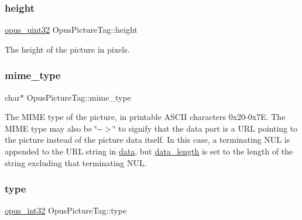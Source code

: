 \subsubsection{\texorpdfstring{height}{height}}
{\footnotesize\ttfamily \hyperlink{opus__types_8h_a643eaaadb9ef6cd44308e0299d8cd8ce}{opus\+\_\+uint32} Opus\+Picture\+Tag\+::height}

The height of the picture in pixels. \mbox{\label{struct_opus_picture_tag_ace7f4978d815b186f6aebefed938c9e2}} 
\subsubsection{\texorpdfstring{mime\+\_\+type}{mime\_type}}
{\footnotesize\ttfamily char$\ast$ Opus\+Picture\+Tag\+::mime\+\_\+type}

The M\+I\+ME type of the picture, in printable A\+S\+C\+II characters 0x20-\/0x7E. The M\+I\+ME type may also be {\ttfamily \char`\"{}-\/-\/$>$\char`\"{}} to signify that the data part is a U\+RL pointing to the picture instead of the picture data itself. In this case, a terminating N\+UL is appended to the U\+RL string in \hyperlink{struct_opus_picture_tag_a0514cb1431547c8b3042b9f3bc9b694f}{data}, but \hyperlink{struct_opus_picture_tag_aaa458d48cd3c9c86b54614389f5b726d}{data\+\_\+length} is set to the length of the string excluding that terminating N\+UL. \mbox{\label{struct_opus_picture_tag_a6e668caeb395b1ec7d438d4a4a9fa845}} 
\subsubsection{\texorpdfstring{type}{type}}
{\footnotesize\ttfamily \hyperlink{opus__types_8h_aa4d309d6f80b99dbabebc8f98879ab9a}{opus\+\_\+int32} Opus\+Picture\+Tag\+::type}

